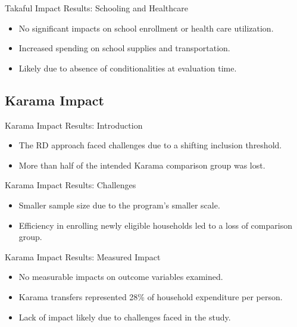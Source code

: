 \documentclass{beamer}
\begin{document}
\begin{frame}{Takaful Impact Results: Schooling and Healthcare}
\begin{itemize}
    \item No significant impacts on school enrollment or health care utilization.
    \item Increased spending on school supplies and transportation.
    \item Likely due to absence of conditionalities at evaluation time.
\end{itemize}
\end{frame}


\subsection{Karama Impact}

\begin{frame}{Karama Impact Results: Introduction}
\begin{itemize}
    \item The RD approach faced challenges due to a shifting inclusion threshold.
    \item More than half of the intended Karama comparison group was lost.
\end{itemize}
\end{frame}

\begin{frame}{Karama Impact Results: Challenges}
\begin{itemize}
    \item Smaller sample size due to the program's smaller scale.
    \item Efficiency in enrolling newly eligible households led to a loss of comparison group.
\end{itemize}
\end{frame}

\begin{frame}{Karama Impact Results: Measured Impact}
\begin{itemize}
    \item No measurable impacts on outcome variables examined.
    \item Karama transfers represented 28\% of household expenditure per person.
    \item Lack of impact likely due to challenges faced in the study.
\end{itemize}
\end{frame}
\end{document}

